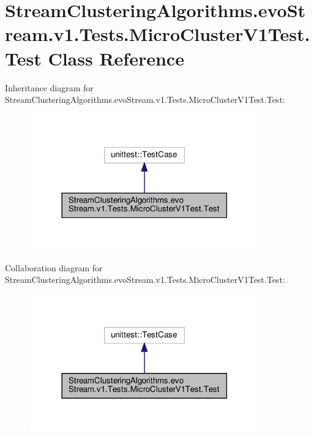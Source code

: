 \hypertarget{classStreamClusteringAlgorithms_1_1evoStream_1_1v1_1_1Tests_1_1MicroClusterV1Test_1_1Test}{}\section{Stream\+Clustering\+Algorithms.\+evo\+Stream.\+v1.\+Tests.\+Micro\+Cluster\+V1\+Test.\+Test Class Reference}
\label{classStreamClusteringAlgorithms_1_1evoStream_1_1v1_1_1Tests_1_1MicroClusterV1Test_1_1Test}


Inheritance diagram for Stream\+Clustering\+Algorithms.\+evo\+Stream.\+v1.\+Tests.\+Micro\+Cluster\+V1\+Test.\+Test\+:\nopagebreak
\begin{figure}[H]
\begin{center}
\leavevmode
\includegraphics[width=282pt]{classStreamClusteringAlgorithms_1_1evoStream_1_1v1_1_1Tests_1_1MicroClusterV1Test_1_1Test__inherit__graph}
\end{center}
\end{figure}


Collaboration diagram for Stream\+Clustering\+Algorithms.\+evo\+Stream.\+v1.\+Tests.\+Micro\+Cluster\+V1\+Test.\+Test\+:\nopagebreak
\begin{figure}[H]
\begin{center}
\leavevmode
\includegraphics[width=282pt]{classStreamClusteringAlgorithms_1_1evoStream_1_1v1_1_1Tests_1_1MicroClusterV1Test_1_1Test__coll__graph}
\end{center}
\end{figure}
